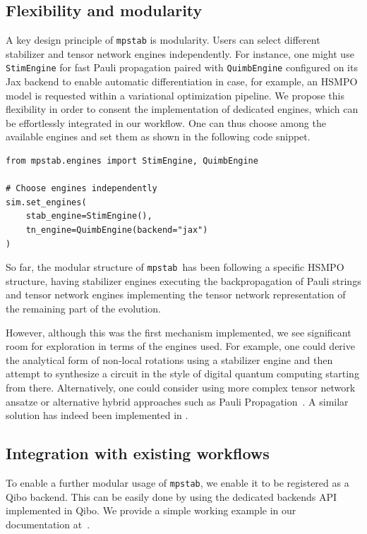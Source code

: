 \documentclass[pra,aps,twocolumn,longbibliography,preprintnumbers,superscriptaddress,nofootnotebib,10pt]{revtex4-2}
\newcommand{\mpstab}{\texttt{mpstab}}
\begin{document}
\subsection{Flexibility and modularity}
A key design principle of \texttt{mpstab} is modularity. Users can select different 
stabilizer and tensor network engines independently. For instance, one might use 
\texttt{StimEngine} for fast Pauli propagation paired with \texttt{QuimbEngine} 
configured on its Jax backend to enable automatic differentiation in case, for example, an HSMPO model is requested within a variational optimization pipeline. We propose this flexibility in order to consent the implementation of dedicated engines, which can be effortlessly integrated in our workflow. One can thus choose among the available engines and set them as shown in the following code snippet. 

\begin{lstlisting}
from mpstab.engines import StimEngine, QuimbEngine

# Choose engines independently
sim.set_engines(
    stab_engine=StimEngine(),
    tn_engine=QuimbEngine(backend="jax")
)
\end{lstlisting}

So far, the modular structure of \mpstab\ has been following a specific HSMPO structure, having stabilizer engines executing the backpropagation of Pauli strings and tensor network engines implementing the tensor network representation of the remaining part of the evolution. 

However, although this was the first mechanism implemented, we see significant room for exploration in terms of the engines used. For example, one could derive the analytical form of non-local rotations using a stabilizer engine and then attempt to synthesize a circuit in the style of digital quantum computing starting from there. Alternatively, one could consider using more complex tensor network ansatze or alternative hybrid approaches such as Pauli Propagation~\cite{Rudolph_2025}. A similar solution has indeed been implemented in \cite{pauli-prop}.


\subsection{Integration with existing workflows}
To enable a further modular usage of \texttt{mpstab}, we enable it to be registered as a Qibo backend. This can be easily done by using the dedicated backends API implemented in Qibo. We provide a simple working example in our documentation at~\cite{mpstab_qibo}.
\end{document}

